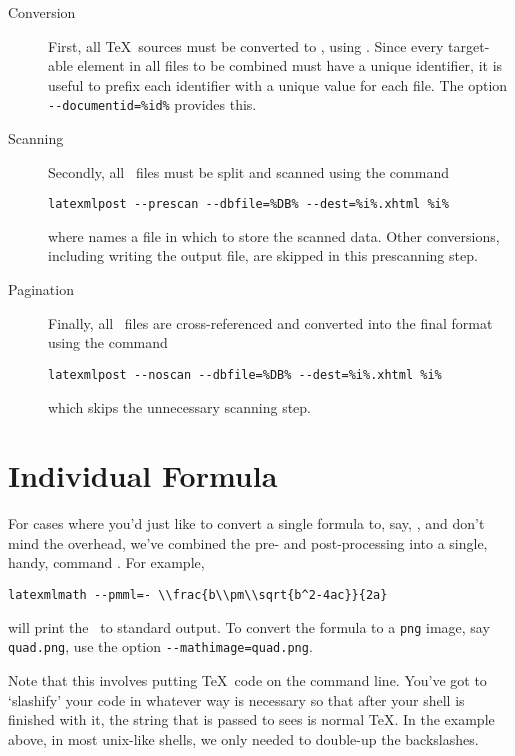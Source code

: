 \documentclass{book}
\newcommand{\shellcode}{\lstinline[style=shell]}
\begin{document}
\begin{description}
\item[Conversion] First, all \TeX\ sources must be converted
   to \XML, using .  Since every target-able element
   in all files to be combined must have a unique identifier, it is useful to
   prefix each identifier with a unique value for each file. 
   The  option \shellcode{--documentid=%

 \item[Scanning] Secondly, all \XML\ files must be split and scanned using
  the command
  \begin{lstlisting}[style=shell]
   latexmlpost --prescan --dbfile=%DB% --dest=%i%.xhtml %i%
  \end{lstlisting}
  where  names a file in which to store the scanned data.
  Other conversions, including writing the output file, are skipped in this prescanning step.
 
 \item[Pagination] Finally, all \XML\ files are cross-referenced and converted into
   the final format using the command
   \begin{lstlisting}[style=shell]
     latexmlpost --noscan --dbfile=%DB% --dest=%i%.xhtml %i%
   \end{lstlisting}
   which skips the unnecessary scanning step.
\end{description}

\section{Individual Formula}\label{usage.latexmlmath}
For cases where you'd just like to convert a single formula to, say, \MathML,
and don't mind the overhead, we've combined the pre- and post-processing into
a single, handy, command .  For example,
\begin{lstlisting}[style=shell]
  latexmlmath --pmml=- \\frac{b\\pm\\sqrt{b^2-4ac}}{2a}
\end{lstlisting}
will print the \MathML\ to standard output.  
To convert the formula to a \texttt{png} image, say \texttt{quad.png},
use the option \shellcode{--mathimage=quad.png}.

Note that this involves putting \TeX\ code on the command line.
You've got to `slashify' your code in whatever way is necessary
so that after your shell is finished with it, the string that
is passed to  sees is normal \TeX.  In the
example above, in most unix-like shells, we only needed to
double-up the backslashes.
\end{document}
